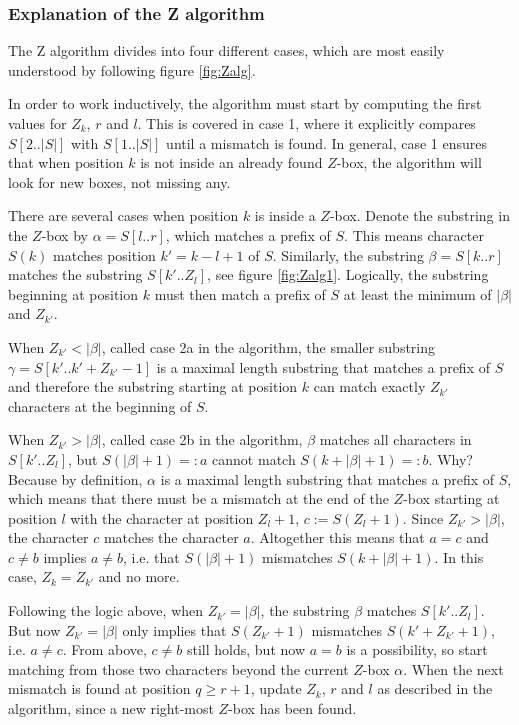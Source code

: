 \subsubsection{Explanation of the Z algorithm}
The Z algorithm divides into four different cases, which are most easily understood by following figure \ref{fig:Zalg}. 

In order to work inductively, the algorithm must start by computing the first values for $Z_k$, $r$ and $l$. This is covered in case 1, where it explicitly compares $S[2..|S|]$ with $S[1..|S|]$ until a mismatch is found. In general, case 1 ensures that when position $k$ is not inside an already found $Z$-box, the algorithm will look for new boxes, not missing any. 

There are several cases when position $k$ is inside a $Z$-box. Denote the substring in the $Z$-box by $\alpha=S[l..r]$, which matches a prefix of $S$. This means character $S(k)$ matches position $k'=k-l+1$ of $S$. Similarly, the substring $\beta=S[k..r]$ matches the substring $S[k'..Z_l]$, see figure \ref{fig:Zalg1}. Logically, the substring beginning at position $k$ must then match a prefix of $S$ at least the minimum of $|\beta|$ and $Z_{k'}$. 

When $Z_{k'}<|\beta|$, called case 2a in the algorithm, the smaller substring $\gamma=S[k'..k'+Z_{k'}-1]$ is a maximal length substring that matches a prefix of $S$ and therefore the substring starting at position $k$ can match exactly $Z_{k'}$ characters at the beginning of $S$. 

When $Z_{k'}>|\beta|$, called case 2b in the algorithm, $\beta$ matches all characters in $S[k'..Z_l]$, but $S(|\beta|+1)=:a$ cannot match $S(k+|\beta|+1)=:b$. Why? Because by definition, $\alpha$ is a maximal length substring that matches a prefix of $S$, which means that there must be a mismatch at the end of the $Z$-box starting at position $l$ with the character at position $Z_l+1$, $c:=S(Z_l+1)$. Since $Z_{k'}>|\beta|$, the character $c$ matches the character $a$. Altogether this means that $a=c$ and $c\neq b$ implies $a\neq b$, i.e. that $S(|\beta|+1)$ mismatches $S(k+|\beta|+1)$. In this case, $Z_k=Z_{k'}$ and no more. 

Following the logic above, when $Z_{k'}=|\beta|$, the substring $\beta$ matches $S[k'..Z_l]$. But now $Z_{k'}=|\beta|$ only implies that $S(Z_{k'}+1)$ mismatches $S(k'+Z_{k'}+1)$, i.e. $a\neq c$. From above, $c\neq b$ still holds, but now $a=b$ is a possibility, so start matching from those two characters beyond the current $Z$-box $\alpha$. When the next mismatch is found at position $q\geq r+1$, update $Z_k$, $r$ and $l$ as described in the algorithm, since a new right-most $Z$-box has been found. 

